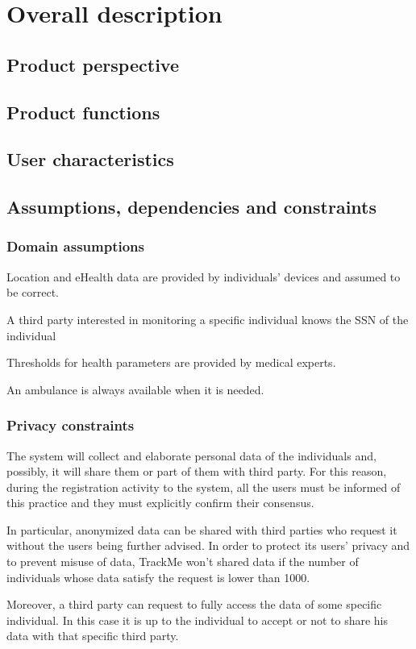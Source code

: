 \chapter{Overall description}
\section{Product perspective}
\section{Product functions}
\section{User characteristics}
\section{Assumptions, dependencies and constraints}

\subsection{Domain assumptions}

\begin{dom}
Location and eHealth data are provided by individuals' devices and assumed to be correct.
\end{dom}
\begin{dom}
A third party interested in monitoring a specific individual knows the SSN of the individual
\end{dom}
\begin{dom}
Thresholds for health parameters are provided by medical experts.
\end{dom}
\begin{dom}
An ambulance is always available when it is needed.
\end{dom}

\subsection{Privacy constraints}
The system will collect and elaborate personal data of the individuals and, possibly, it will share them or part of them with third party.  For this reason, during the registration activity to the system, all the users must be informed of this practice and they must explicitly confirm their consensus.

In particular, anonymized data can be shared with third parties who request it without the users being further advised. In order to protect its users' privacy and to prevent misuse of data, TrackMe won't shared data if the number of individuals whose data satisfy the request is lower than 1000.

Moreover, a third party can request to fully access the data of some specific individual. In this case it is up to the individual to accept or not to share his data with that specific third party.
